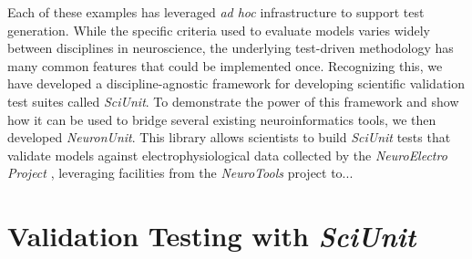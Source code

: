 \documentclass[11pt,letterpaper]{article}
\begin{document}
Each of these examples has leveraged \emph{ad hoc} infrastructure to support test generation. While the specific criteria used to evaluate models varies widely between disciplines in neuroscience, the underlying test-driven methodology has many common features that could be implemented once. Recognizing this, we have developed a discipline-agnostic framework for developing scientific validation test suites called \textit{SciUnit}\cite{sciunit_url}. To demonstrate the power of this framework and show how it can be used to bridge several existing neuroinformatics tools, we then  developed \textit{NeuronUnit\-}. This library allows scientists to build \textit{SciUnit} tests that validate   models against electrophysiological data collected by the \textit{NeuroElectro Project} \cite{neuroelectro_url}, leveraging facilities from the \textit{NeuroTools} project to...%

\section{Validation Testing with \textit{SciUnit}}
\end{document}
